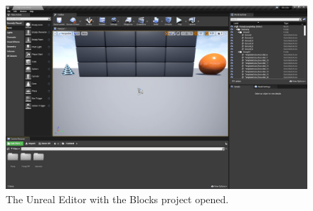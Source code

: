 \begin{figure}[t]
    \centering
    \includegraphics[width=\textwidth]{figures/ueditor_first_view}
    \caption[Unreal Editor first view]{
        The Unreal Editor with the Blocks project opened.}%
    \label{fig:ueditor_first_view}
\end{figure}

